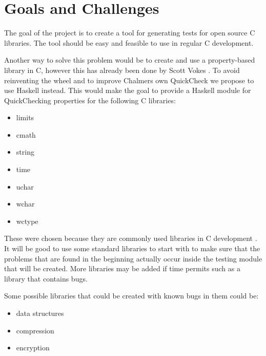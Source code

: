 \section{Goals and Challenges}


The goal of the project is to create a tool for generating tests for open source C libraries.
The tool should be easy and feasible to use in regular C development.

Another way to solve this problem would be to create and use a property-based library in C, however this has already been done by Scott Vokes \citep{theft}.
To avoid reinventing the wheel and to improve Chalmers own QuickCheck we propose to use Haskell instead.
This would make the goal to provide a Haskell module for QuickChecking properties for the following C libraries:

\begin{itemize}
  \item limits
  \item cmath
  \item string
  \item time
  \item uchar
  \item wchar
  \item wctype
\end{itemize}

These were chosen because they are commonly used libraries in C development \citep{website:en.wikipedia.org}.
It will be good to use some standard libraries to start with to make sure that the problems that are found in the beginning actually occur inside the testing module that will be created.
More libraries may be added if time permits such as a library that contains bugs.

Some possible libraries that could be created with known bugs in them could be:

\begin{itemize}
  \item data structures
  \item compression
  \item encryption
\end{itemize}
